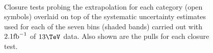 \begin{figure}[h!]
  \begin{center}
    ~~
    \caption{Closure tests probing the \alphat extrapolation for each
      \njet category (open symbols) overlaid on top of the systematic
      uncertainty estimates used for each of the seven \scalht bins
      (shaded bands) carried out with $2.1\ifb$ of $13\tev$
      data. Also shown are the pulls for each closure test.}
    \label{fig:closureAlphaT}
  \end{center} 
\end{figure}


